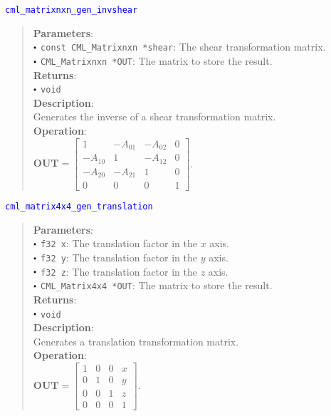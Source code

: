 \documentclass[a4paper,oneside,8pt]{extarticle}
\newcommand{\function}[1]{
  \noindent\textcolor{blue}{\texttt{#1}}
  \vspace{-0.3em}
}
\renewcommand{\dot}{\raisebox{0.3ex}{\scalebox{0.6}{$\bullet$}}}
\theoremstyle{definition}
\begin{document}
\function{cml\_matrixnxn\_gen\_invshear}
\begin{quote}
  \textbf{Parameters}: \\
  $\dot$ \texttt{const CML\_Matrixnxn *shear}: The shear transformation matrix. \\
  $\dot$ \texttt{CML\_Matrixnxn *OUT}: The matrix to store the result. \\
  \textbf{Returns}: \\
  $\dot$ \texttt{void} \\

  \vspace{-0.75em}
  \textbf{Description}: \\
  Generates the inverse of a shear transformation matrix. \\

  \vspace{-0.75em}
  \textbf{Operation}: \\
  $\mathbf{OUT} = \begin{bmatrix}
  1 & -A_{01} & -A_{02} & 0 \\
  -A_{10} & 1 & -A_{12} & 0 \\
  -A_{20} & -A_{21} & 1 & 0 \\
  0 & 0 & 0 & 1
  \end{bmatrix}$. \\
\end{quote}

\function{cml\_matrix4x4\_gen\_translation}
\begin{quote}
  \textbf{Parameters}: \\
  $\dot$ \texttt{f32 x}: The translation factor in the $x$ axis. \\
  $\dot$ \texttt{f32 y}: The translation factor in the $y$ axis. \\
  $\dot$ \texttt{f32 z}: The translation factor in the $z$ axis. \\
  $\dot$ \texttt{CML\_Matrix4x4 *OUT}: The matrix to store the result. \\
  \textbf{Returns}: \\
  $\dot$ \texttt{void} \\

  \vspace{-0.75em}
  \textbf{Description}: \\
  Generates a translation transformation matrix. \\

  \vspace{-0.75em}
  \textbf{Operation}: \\
  $\mathbf{OUT} = \begin{bmatrix}
  1 & 0 & 0 & x \\
  0 & 1 & 0 & y \\
  0 & 0 & 1 & z \\
  0 & 0 & 0 & 1
  \end{bmatrix}$. \\
\end{quote}
\end{document}
